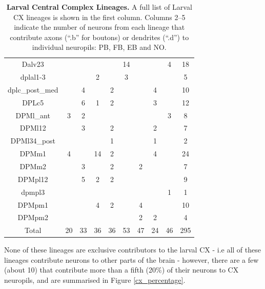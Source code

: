 \begin{table} [H]
{\begin{tabular}{|c|c|c|c|c|c|c|c|c|c|}
        Dalv23 &  &  &  &  & 14 &  &  & 4 & 18 \\
        dplal1-3 &  &  & 2 &  & 3 &  &  &  & 5 \\
        dplc\_post\_med &  & 4 &  & 2 &  &  & 4 &  & 10 \\
        DPLc5 &  & 6 & 1 & 2 &  &  & 3 &  & 12 \\
        DPMl\_ant & 3 & 2 &  &  &  &  &  & 3 & 8 \\
        DPMl12 &  & 3 &  & 2 &  &  & 2 &  & 7 \\
        DPMl34\_post &  &  &  & 1 &  &  & 1 &  & 2 \\
        DPMm1 & 4 &  & 14 & 2 &  &  & 4 &  & 24 \\
        DPMm2 &  & 3 &  & 2 &  & 2 &  &  & 7 \\
        DPMpl12 &  & 5 & 2 & 2 &  &  &  &  & 9 \\
        dpmpl3 &  &  &  &  &  &  &  & 1 & 1 \\
        DPMpm1 &  &  & 4 & 2 &  & 4 &  &  & 10 \\
        DPMpm2 &  &  &  &  &  & 2 & 2 &  & 4 \\
        \bottomrule
        Total & 20 & 33 & 36 & 36 & 53 & 47 & 24 & 46 & 295 \\
        \bottomrule
        \end{tabular}
        }
        \caption[Larval Central Complex Lineages]{\textbf{Larval Central Complex Lineages.} A full list of Larval CX lineages is shown in the first column.  Columns 2--5 indicate the number of neurons from each lineage that contribute axons (“.b” for boutons) or dendrites (“.d”) to individual neuropils: PB, FB, EB and NO.}
        \label{larvallineages}
        \end{table}

    None of these lineages are exclusive contributors to the larval CX - i.e all of these lineages contribute neurons to other parts of the brain - however, there are a few (about 10) that contribute more than a fifth (20\%) of their neurons to CX neuropils, and are summarised in Figure \ref{cx_percentage}.

